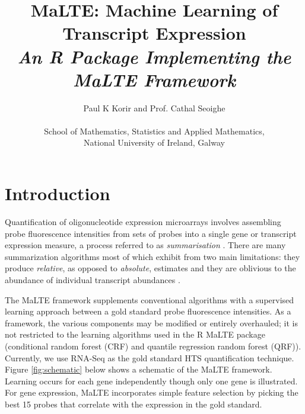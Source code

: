 \documentclass[a4paper,12pt]{article}
\title{\textbf{MaLTE: Machine Learning of Transcript Expression}\\\textit{An \textsf{R} Package Implementing the MaLTE Framework}}
\author{Paul K Korir and Prof. Cathal Seoighe\\
\\
School of Mathematics, Statistics and Applied Mathematics,\\
National University of Ireland, Galway
}
\date{}
\begin{document}
\maketitle

\newpage

\tableofcontents

\newpage


\section{Introduction}
\label{introduction}
Quantification of oligonucleotide expression microarrays involves assembling probe fluorescence intensities from sets of probes into a single gene or transcript expression measure, a process referred to as \textit{summarisation} \cite{irizarry2003summaries}. There are many summarization algorithms \cite{irizarry2006comparison} most of which exhibit from two main limitations: they produce \textit{relative}, as opposed to \textit{absolute}, estimates \cite{irizarry2005multiple, fu2009estimating} and they are oblivious to the abundance of individual transcript abundances \cite{malone2011microarrays}. 

The \textsf{MaLTE} framework supplements conventional algorithms with a supervised learning approach between a gold standard probe fluorescence intensities. As a framework, the various components may be modified or entirely overhauled; it is not restricted to the learning algorithms used in the \textsf{R} \textsf{MaLTE} package (conditional random forest (CRF) and quantile regression random forest (QRF)). Currently, we use RNA-Seq as the gold standard HTS quantification technique. Figure \ref{fig:schematic} below shows a schematic of the \textsf{MaLTE} framework. Learning occurs for each gene independently though only one gene is illustrated. For gene expression, \textsf{MaLTE} incorporates simple feature selection by picking the best 15 probes that correlate with the expression in the gold standard.
\end{document}
